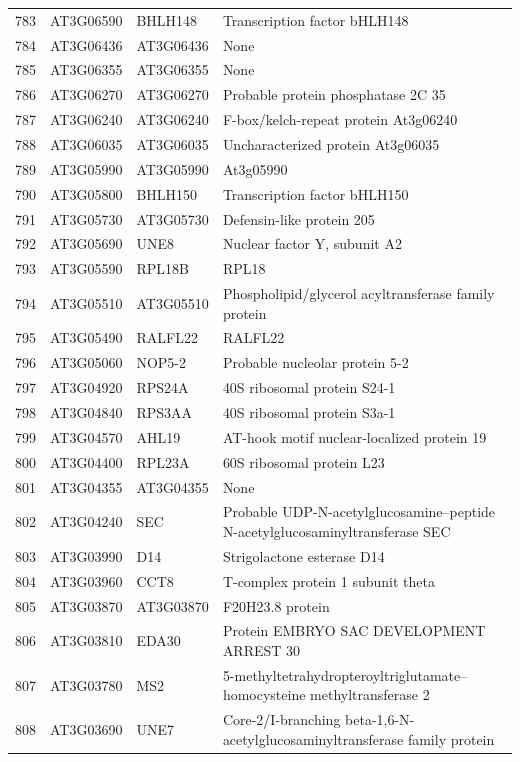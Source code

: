 \documentclass[11pt]{article}
\begin{document}
\begin{center}
\begin{tabular}{rlll}
783 & AT3G06590 & BHLH148 & Transcription factor bHLH148\\
784 & AT3G06436 & AT3G06436 & None\\
785 & AT3G06355 & AT3G06355 & None\\
786 & AT3G06270 & AT3G06270 & Probable protein phosphatase 2C 35\\
787 & AT3G06240 & AT3G06240 & F-box/kelch-repeat protein At3g06240\\
788 & AT3G06035 & AT3G06035 & Uncharacterized protein At3g06035\\
789 & AT3G05990 & AT3G05990 & At3g05990\\
790 & AT3G05800 & BHLH150 & Transcription factor bHLH150\\
791 & AT3G05730 & AT3G05730 & Defensin-like protein 205\\
792 & AT3G05690 & UNE8 & Nuclear factor Y, subunit A2\\
793 & AT3G05590 & RPL18B & RPL18\\
794 & AT3G05510 & AT3G05510 & Phospholipid/glycerol acyltransferase family protein\\
795 & AT3G05490 & RALFL22 & RALFL22\\
796 & AT3G05060 & NOP5-2 & Probable nucleolar protein 5-2\\
797 & AT3G04920 & RPS24A & 40S ribosomal protein S24-1\\
798 & AT3G04840 & RPS3AA & 40S ribosomal protein S3a-1\\
799 & AT3G04570 & AHL19 & AT-hook motif nuclear-localized protein 19\\
800 & AT3G04400 & RPL23A & 60S ribosomal protein L23\\
801 & AT3G04355 & AT3G04355 & None\\
802 & AT3G04240 & SEC & Probable UDP-N-acetylglucosamine--peptide N-acetylglucosaminyltransferase SEC\\
803 & AT3G03990 & D14 & Strigolactone esterase D14\\
804 & AT3G03960 & CCT8 & T-complex protein 1 subunit theta\\
805 & AT3G03870 & AT3G03870 & F20H23.8 protein\\
806 & AT3G03810 & EDA30 & Protein EMBRYO SAC DEVELOPMENT ARREST 30\\
807 & AT3G03780 & MS2 & 5-methyltetrahydropteroyltriglutamate--homocysteine methyltransferase 2\\
808 & AT3G03690 & UNE7 & Core-2/I-branching beta-1,6-N-acetylglucosaminyltransferase family protein\\

\end{tabular}
\end{center}
\end{document}
